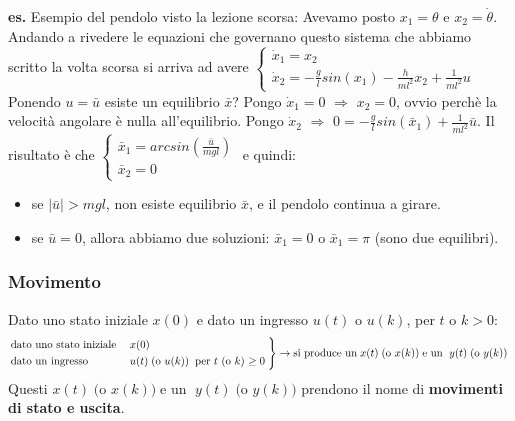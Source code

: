 \newline
\textbf{es.} Esempio del pendolo visto la lezione scorsa:\newline
Avevamo posto $x_1 = \theta$ e $x_2 = \dot{\theta}$. Andando a rivedere le equazioni che governano questo sistema che abbiamo scritto la volta scorsa si arriva ad avere $\begin{cases}
    \dot{x}_1 = x_2\\
    \dot{x}_2 = - \frac{g}{l} sin(x_1) - \frac{h}{ml^2} x_2 + \frac{1}{ml^2}u
\end{cases}$
Ponendo $u = \bar{u}$ esiste un equilibrio $\bar{x}$?\newline
Pongo $\dot{x}_1= 0$ $\Longrightarrow$ $x_2 = 0$, ovvio perchè la velocità angolare è nulla all'equilibrio.\newline
Pongo $\dot{x}_2$ $\Longrightarrow$ $0 = - \frac{g}{l}sin(\bar{x}_1) + \frac{1}{ml^2} \bar{u}$.\newline
Il risultato è che $\begin{cases}
    \bar{x}_1 = arcsin(\frac{\bar{u}}{mgl})\\
    \bar{x}_2 = 0
\end{cases}$ e quindi:
\begin{itemize}
    \item  se $|\bar{u}| > mgl$, non esiste equilibrio $\bar{x}$, e il pendolo continua a girare.
    \item  se $\bar{u} = 0$, allora abbiamo due soluzioni: $\bar{x}_1 = 0$ o $\bar{x}_1 = \pi$ (sono due equilibri).
\end{itemize}
\subsubsection{Movimento}
Dato uno stato iniziale $x(0)$ e dato un ingresso $u(t)$ o $u(k)$, per $t$ o $k > 0$:
\[
    \begin{rcases}
        \text{dato uno stato iniziale}\; &x(0)\\
        \text{dato un ingresso}\; &u(t) \;\text{(o $u(k)$)} \;\;\text{per $t$ (o $k$) $\geq 0$}\;
    \end{rcases} \rightarrow \text{si produce un}\; x(t) \;\text{(o $x(k)$)}\; \text{e un }\;y(t) \;\text{(o $y(k)$)}\; 
\]
Questi $x(t) \;\text{(o $x(k)$)} \;\text{e un }\;y(t) \;\text{(o $y(k)$)}$ prendono il nome di \textbf{movimenti di stato e uscita}.
